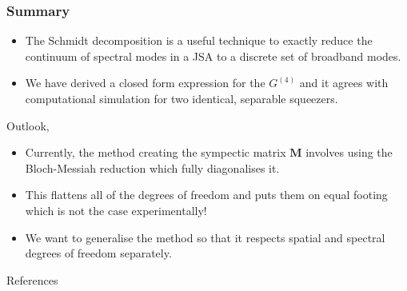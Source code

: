 \documentclass{beamer}
\begin{document}
\begin{frame}
\frametitle{Summary}
\begin{itemize}
    \item The Schmidt decomposition is a useful technique to exactly reduce the continuum of spectral modes in a JSA to a discrete set of broadband modes.
    \item We have derived a closed form expression for the $G^{(4)}$ and it agrees with computational simulation for two identical, separable squeezers.
    \end{itemize}
Outlook,
\begin{itemize}
    \item Currently, the method creating the sympectic matrix $\textbf{M}$ involves using the Bloch-Messiah reduction which fully diagonalises it. 
    \item This flattens all of the degrees of freedom and puts them on equal footing which is not the case experimentally!
    \item We want to generalise the method so that it respects spatial and spectral degrees of freedom separately.
\end{itemize}
\end{frame}

\begin{frame}{References}


\end{frame}
\end{document}
